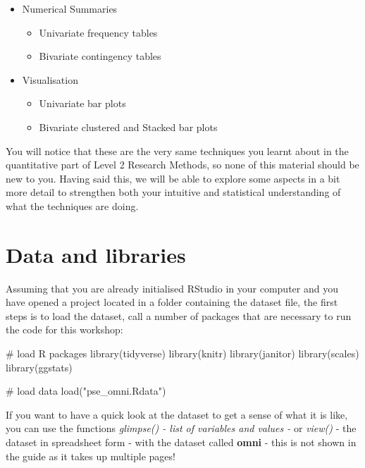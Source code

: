 \documentclass[
  letterpaper,
  DIV=11,
  numbers=noendperiod]{scrreprt}
\newenvironment{Shaded}{\begin{snugshade}}{\end{snugshade}}
\newcommand{\CommentTok}[1]{\textcolor[rgb]{0.37,0.37,0.37}{#1}}
\newcommand{\FunctionTok}[1]{\textcolor[rgb]{0.28,0.35,0.67}{#1}}
\newcommand{\NormalTok}[1]{\textcolor[rgb]{0.00,0.23,0.31}{#1}}
\newcommand{\StringTok}[1]{\textcolor[rgb]{0.13,0.47,0.30}{#1}}
\newcounter{none} %
\providecommand{\tightlist}{%
  \setlength{\itemsep}{0pt}\setlength{\parskip}{0pt}}
\begin{document}
\begin{itemize}
\tightlist
\item
  Numerical Summaries

  \begin{itemize}
  \tightlist
  \item
    Univariate frequency tables
  \item
    Bivariate contingency tables
  \end{itemize}
\item
  Visualisation

  \begin{itemize}
  \tightlist
  \item
    Univariate bar plots
  \item
    Bivariate clustered and Stacked bar plots
  \end{itemize}
\end{itemize}

You will notice that these are the very same techniques you learnt about
in the quantitative part of Level 2 Research Methods, so none of this
material should be new to you. Having said this, we will be able to
explore some aspects in a bit more detail to strengthen both your
intuitive and statistical understanding of what the techniques are
doing.

\section{Data and libraries}\label{data-and-libraries}

Assuming that you are already initialised RStudio in your computer and
you have opened a project located in a folder containing the dataset
file, the first steps is to load the dataset, call a number of packages
that are necessary to run the code for this workshop:

\begin{Shaded}
\begin{Highlighting}[]
\CommentTok{\# load R packages}
\FunctionTok{library}\NormalTok{(tidyverse)}
\FunctionTok{library}\NormalTok{(knitr)}
\FunctionTok{library}\NormalTok{(janitor)}
\FunctionTok{library}\NormalTok{(scales)}
\FunctionTok{library}\NormalTok{(ggstats)}

\CommentTok{\# load data}
\FunctionTok{load}\NormalTok{(}\StringTok{"pse\_omni.Rdata"}\NormalTok{)}
\end{Highlighting}
\end{Shaded}

If you want to have a quick look at the dataset to get a sense of what
it is like, you can use the functions \emph{glimpse() - list of
variables and values -} or \emph{view()} - the dataset in spreadsheet
form - with the dataset called \textbf{omni} - this is not shown in the
guide as it takes up multiple pages!
\end{document}
